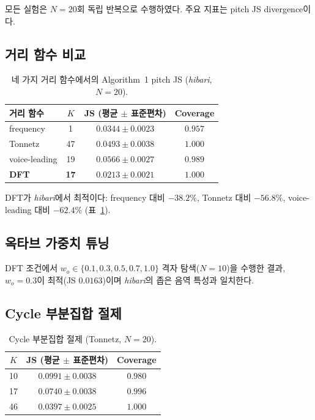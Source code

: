 \documentclass[conference,10pt,a4paper]{IEEEtran}
\begin{document}
모든 실험은 $N = 20$회 독립 반복으로 수행하였다. 주요 지표는
pitch JS divergence이다.

\subsection{거리 함수 비교}
\label{subsec:dist_compare}

\begin{table}[t]
\centering
\caption{네 가지 거리 함수에서의 Algorithm~1 pitch JS
(\emph{hibari}, $N=20$).}
\label{tab:baselines}
\begin{tabular}{lccc}
\toprule
거리 함수 & $K$ & JS (평균 $\pm$ 표준편차) & Coverage \\
\midrule
frequency      & 1  & $0.0344 \pm 0.0023$ & $0.957$ \\
Tonnetz        & 47 & $0.0493 \pm 0.0038$ & $1.000$ \\
voice-leading  & 19 & $0.0566 \pm 0.0027$ & $0.989$ \\
\textbf{DFT}   & \textbf{17} & $\mathbf{0.0213 \pm 0.0021}$ & $1.000$ \\
\bottomrule
\end{tabular}
\end{table}

DFT가 \emph{hibari}에서 최적이다: frequency 대비 $-38.2\%$,
Tonnetz 대비 $-56.8\%$, voice-leading 대비 $-62.4\%$
(표~\ref{tab:baselines}).

\subsection{옥타브 가중치 튜닝}
\label{subsec:octave}

DFT 조건에서 $w_o \in \{0.1, 0.3, 0.5, 0.7, 1.0\}$ 격자 탐색($N=10$)을
수행한 결과, $w_o = 0.3$이 최적(JS $0.0163$)이며
\emph{hibari}의 좁은 음역 특성과 일치한다.

\subsection{Cycle 부분집합 절제}

\begin{table}[t]
\centering
\caption{Cycle 부분집합 절제 (Tonnetz, $N=20$).}
\label{tab:ablation}
\begin{tabular}{ccc}
\toprule
$K$ & JS (평균 $\pm$ 표준편차) & Coverage \\
\midrule
10  & $0.0991 \pm 0.0038$ & $0.980$ \\
17  & $0.0740 \pm 0.0038$ & $0.996$ \\
46  & $\mathbf{0.0397 \pm 0.0025}$ & $1.000$ \\
\bottomrule
\end{tabular}
\end{table}
\end{document}
